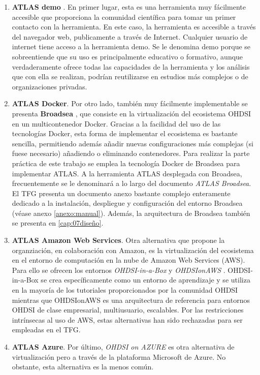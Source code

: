 \begin{enumerate}[label=\alph*.]

    \item \textbf{ATLAS demo} \cite{ATLASdemo}. En primer lugar, esta es una herramienta muy fácilmente accesible que proporciona la comunidad científica para tomar un primer contacto con la herramienta. En este caso, la herramienta es accesible a través del navegador web, publicamente a través de Internet. Cualquier usuario de internet tiene acceso a la herramienta demo. Se le denomina demo porque se sobreentiende que su uso es principalmente educativo o formativo, aunque verdaderamente ofrece todas las capacidades de la herramienta y los análisis que con ella se realizan, podrían reutilizarse en estudios más complejos o de organizaciones privadas.

    \item \textbf{ATLAS Docker}. Por otro lado, también muy fácilmente implementable se presenta \textbf{Broadsea} \cite{githubBroadsea}, que consiste en la virtualización del ecosistema OHDSI en un multicontenedor Docker. Gracias a la facilidad del uso de las tecnologías Docker, esta forma de implementar el ecosistema es bastante sencilla, permitiendo además añadir nuevas configuraciones más complejas (si fuese necesario) añadiendo o eliminando contenedores. Para realizar la parte práctica de este trabajo se emplea la tecnología Docker de Broadsea para implementar ATLAS. A la herramienta ATLAS desplegada con Broadsea, frecuentemente se le denominará a lo largo del documento \textit{ATLAS Broadsea}. El TFG presenta un documento anexo bastante complejo enteramente dedicado a la instalación, despliegue y configuración del entorno Broadsea (véase anexo \ref{anexo:manual}). Además, la arquitectura de Broadsea también se presenta en \ref{cap:07diseño}.

    \item \textbf{ATLAS Amazon Web Services}. Otra alternativa que propone la organziación, en colaboración con Amazon, es la virtualización del ecosistema en el entorno de computación en la nube de Amazon Web Services (AWS). Para ello se ofrecen los entornos \textit{OHDSI-in-a-Box} \cite{githubOHDSIBox} y \textit{OHDSIonAWS} \cite{githubOHDSIAWS}. OHDSI-in-a-Box se crea específicamente como un entorno de aprendizaje y se utiliza en la mayoría de los tutoriales proporcionados por la comunidad OHDSI mientras que OHDSIonAWS es una arquitectura de referencia para entornos OHDSI de clase empresarial, multiusuario, escalables. Por las restricciones intrínsecas al uso de AWS, estas alternativas han sido rechazadas para ser empleadas en el TFG.
    
    \item \textbf{ATLAS Azure}. Por último, \textit{OHDSI on AZURE} \cite{OHDSIonAzure} es otra alternativa de virtualización pero a través de la plataforma Microsoft de Azure. No obstante, esta alternativa es la menos común.
    
\end{enumerate}

